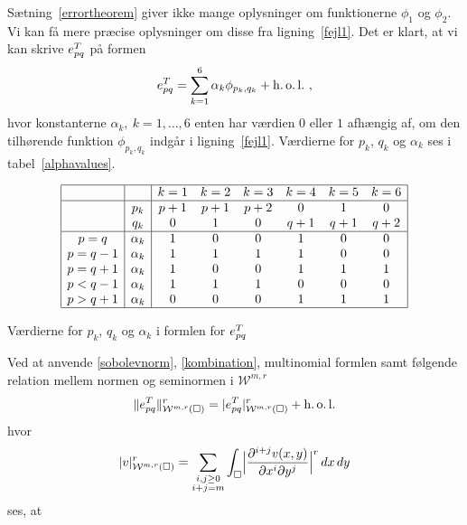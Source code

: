 Sætning~\ref{errortheorem} giver ikke mange oplysninger om
funktionerne $\phi_1$ og $\phi_2$.
Vi kan få mere præcise oplysninger om disse fra ligning~\eqref{fejl1}. Det er
klart, at vi kan skrive $e_{pq}^T$ på formen
\begin{equation} \label{kombination}
  e_{pq}^T = \sum_{k=1}^6 \alpha_k \phi_{p_k,q_k} + \operatorname{h.o.l.}\ ,
\end{equation}
hvor konstanterne $\alpha_k, \ k=1,\ldots,6$ enten har værdien $0$ eller
$1$ afhængig af, om den tilhørende funktion $\phi_{p_k,q_k}$ indgår i
ligning~\eqref{fejl1}. Værdierne for $p_k$, $q_k$ og $\alpha_k$ ses i
tabel~\ref{alphavalues}.
\begin{table}[htb]
\begin{displaymath}
\begin{array}{|c|c|cccccc|}
  \hline & & k=1 & k=2 & k=3 & k=4 & k=5 & k=6 \\
  \hline & p_k & p+1 & p+1 & p+2 & 0 & 1 & 0 \\
         & q_k & 0 & 1 & 0 & q+1 & q+1 & q+2 \\
  \hline p=q   & \alpha_k & 1 & 0 & 0 & 1 & 0 & 0 \\
         p=q-1 & \alpha_k & 1 & 1 & 1 & 1 & 0 & 0 \\
         p=q+1 & \alpha_k & 1 & 0 & 0 & 1 & 1 & 1 \\
         p<q-1 & \alpha_k & 1 & 1 & 1 & 0 & 0 & 0 \\
         p>q+1 & \alpha_k & 0 & 0 & 0 & 1 & 1 & 1 \\
  \hline
\end{array}
\end{displaymath}
\caption{Værdierne for $p_k$, $q_k$ og $\alpha_k$ i formlen for $e_{pq}^T$\label{alphavalues}}
\end{table}
Ved at anvende \eqref{sobolevnorm}, \eqref{kombination}, multinomial
formlen samt følgende relation mellem normen og seminormen i ${\mathcal W}^{m,r}$
\begin{equation}
  \|e_{pq}^T\|_{{\mathcal W}^{m,r}(\Box)}^r =  |e_{pq}^T|_{{\mathcal W}^{m,r}(\Box)}^r + \operatorname{h.o.l.}
\end{equation}
hvor
\begin{equation}
  |v|_{{\mathcal W}^{m,r}(\Box)}^r = \sum_{\substack{ i,j\geq 0 \\ i+j = m}} \int_\Box
  \Bigl| \frac{\partial^{i+j} v(x,y)}{\partial x^i \partial y^j} \Bigr|^r\, dx\, dy
\end{equation}
ses, at
